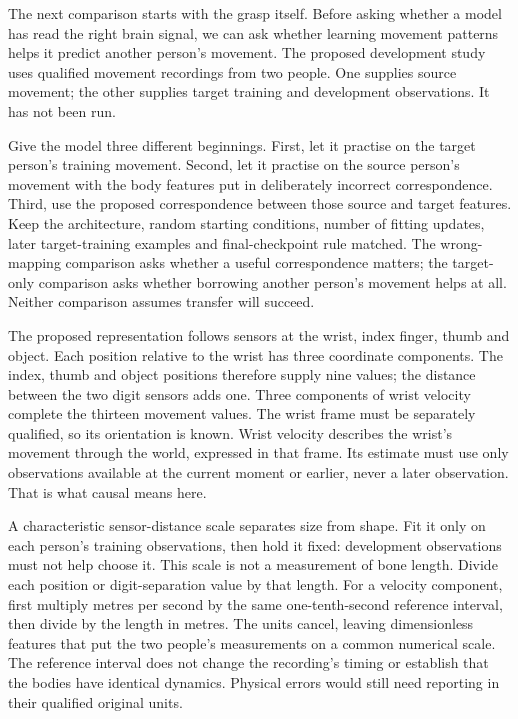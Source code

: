 The next comparison starts with the grasp itself. Before asking whether a model has read the right brain signal, we can ask whether learning movement patterns helps it predict another person's movement. The proposed development study uses qualified movement recordings from two people. One supplies source movement; the other supplies target training and development observations. It has not been run.\par

Give the model three different beginnings. First, let it practise on the target person's training movement. Second, let it practise on the source person's movement with the body features put in deliberately incorrect correspondence. Third, use the proposed correspondence between those source and target features. Keep the architecture, random starting conditions, number of fitting updates, later target-training examples and final-checkpoint rule matched. The wrong-mapping comparison asks whether a useful correspondence matters; the target-only comparison asks whether borrowing another person's movement helps at all. Neither comparison assumes transfer will succeed.\par

The proposed representation follows sensors at the wrist, index finger, thumb and object. Each position relative to the wrist has three coordinate components. The index, thumb and object positions therefore supply nine values; the distance between the two digit sensors adds one. Three components of wrist velocity complete the thirteen movement values. The wrist frame must be separately qualified, so its orientation is known. Wrist velocity describes the wrist's movement through the world, expressed in that frame. Its estimate must use only observations available at the current moment or earlier, never a later observation. That is what causal means here.\par

A characteristic sensor-distance scale separates size from shape. Fit it only on each person's training observations, then hold it fixed: development observations must not help choose it. This scale is not a measurement of bone length. Divide each position or digit-separation value by that length. For a velocity component, first multiply metres per second by the same one-tenth-second reference interval, then divide by the length in metres. The units cancel, leaving dimensionless features that put the two people's measurements on a common numerical scale. The reference interval does not change the recording's timing or establish that the bodies have identical dynamics. Physical errors would still need reporting in their qualified original units.\par

